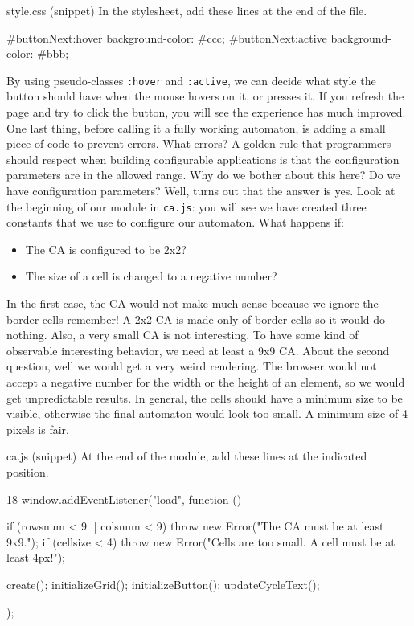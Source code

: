 \begin{programcode}{style.css (snippet)}
In the stylesheet, add these lines at the end of the file.
\begin{codecss}
#buttonNext:hover {
  background-color: #ccc;
}
#buttonNext:active {
  background-color: #bbb;
}
\end{codecss}
\end{programcode}

By using pseudo-classes \texttt{:hover} and \texttt{:active}, we can decide what style the button should
have when the mouse hovers on it, or presses it. If you refresh the page and try to click the button, you
will see the experience has much improved.\\

One last thing, before calling it a fully working automaton, is adding a small piece of code to prevent
errors. What errors? A golden rule that programmers should respect when building configurable applications
is that the configuration parameters are in the allowed range. Why do we bother about this here?
Do we have configuration parameters? Well, turns out that the answer is yes. Look at the beginning
of our module in \texttt{ca.js}: you will see we have created three constants that we use to configure
our automaton. What happens if:

\begin{itemize}
\item The CA is configured to be 2x2?
\item The size of a cell is changed to a negative number?
\end{itemize}

In the first case, the CA would not make much sense because we ignore the border cells remember! A 2x2 CA
is made only of border cells so it would do nothing. Also, a very small CA is not interesting. To have some
kind of observable interesting behavior, we need at least a 9x9 CA. About the second question, well we would
get a very weird rendering. The browser would not accept a negative number for the width or the height of
an element, so we would get unpredictable results. In general, the cells should have a minimum size to be
visible, otherwise the final automaton would look too small. A minimum size of 4 pixels is fair.

\begin{programcode}{ca.js (snippet)}
At the end of the module, add these lines at the indicated position.
\begin{codeh1}{1}{8}
window.addEventListener("load", function () {
  if (rowsnum < 9 || colsnum < 9) {
    throw new Error("The CA must be at least 9x9.");
  }
  if (cellsize < 4) {
    throw new Error("Cells are too small. A cell must be at least 4px!");
  }

  create();
  initializeGrid();
  initializeButton();
  updateCycleText();
});
\end{codeh1}
\end{programcode}

